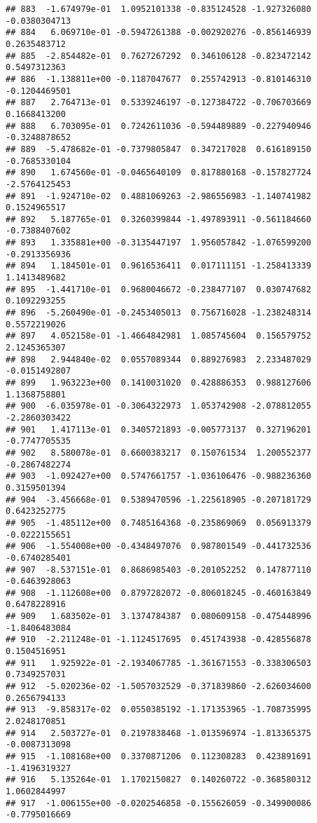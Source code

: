 \documentclass[
]{article}
\begin{document}
\begin{verbatim}
## 883  -1.674979e-01  1.0952101338 -0.835124528 -1.927326080 -0.0380304713
## 884   6.069710e-01 -0.5947261388 -0.002920276 -0.856146939  0.2635483712
## 885  -2.854482e-01  0.7627267292  0.346106128 -0.823472142  0.5497312363
## 886  -1.138811e+00 -0.1187047677  0.255742913 -0.810146310 -0.1204469501
## 887   2.764713e-01  0.5339246197 -0.127384722 -0.706703669  0.1668413200
## 888   6.703095e-01  0.7242611036 -0.594489889 -0.227940946 -0.3248878652
## 889  -5.478682e-01 -0.7379805847  0.347217028  0.616189150 -0.7685330104
## 890   1.674560e-01 -0.0465640109  0.817880168 -0.157827724 -2.5764125453
## 891  -1.924710e-02  0.4881069263 -2.986556983 -1.140741982  0.1524965517
## 892   5.187765e-01  0.3260399844 -1.497893911 -0.561184660 -0.7388407602
## 893   1.335881e+00 -0.3135447197  1.956057842 -1.076599200 -0.2913356936
## 894   1.184501e-01  0.9616536411  0.017111151 -1.258413339  1.1413489682
## 895  -1.441710e-01  0.9680046672 -0.238477107  0.030747682  0.1092293255
## 896  -5.260490e-01 -0.2453405013  0.756716028 -1.238248314  0.5572219026
## 897   4.052158e-01 -1.4664842981  1.085745604  0.156579752  2.1245365307
## 898   2.944840e-02  0.0557089344  0.889276983  2.233487029 -0.0151492807
## 899   1.963223e+00  0.1410031020  0.428886353  0.988127606  1.1368758801
## 900  -6.035978e-01 -0.3064322973  1.053742908 -2.078812055 -2.2860303422
## 901   1.417113e-01  0.3405721893 -0.005773137  0.327196201 -0.7747705535
## 902   8.580078e-01  0.6600383217  0.150761534  1.200552377 -0.2867482274
## 903  -1.092427e+00  0.5747661757 -1.036106476 -0.988236360  0.3159501394
## 904  -3.456668e-01  0.5389470596 -1.225618905 -0.207181729  0.6423252775
## 905  -1.485112e+00  0.7485164368 -0.235869069  0.056913379 -0.0222155651
## 906  -1.554008e+00 -0.4348497076  0.987801549 -0.441732536 -0.6740285401
## 907  -8.537151e-01  0.8686985403 -0.201052252  0.147877110 -0.6463928063
## 908  -1.112608e+00  0.8797282072 -0.806018245 -0.460163849  0.6478228916
## 909   1.683502e-01  3.1374784387  0.080609158 -0.475448996 -1.8406483084
## 910  -2.211248e-01 -1.1124517695  0.451743938 -0.428556878  0.1504516951
## 911   1.925922e-01 -2.1934067785 -1.361671553 -0.338306503  0.7349257031
## 912  -5.020236e-02 -1.5057032529 -0.371839860 -2.626034600  0.2656794133
## 913  -9.858317e-02  0.0550385192 -1.171353965 -1.708735995  2.0248170851
## 914   2.503727e-01  0.2197838468 -1.013596974 -1.813365375 -0.0087313098
## 915  -1.108168e+00  0.3370871206  0.112308283  0.423891691 -1.4196319327
## 916   5.135264e-01  1.1702150827  0.140260722 -0.368580312  1.0602844997
## 917  -1.006155e+00 -0.0202546858 -0.155626059 -0.349900086 -0.7795016669

\end{verbatim}
\end{document}
